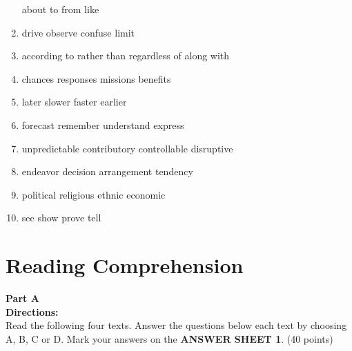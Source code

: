 \begin{enumerate}
\fourchoices
{about}
{to}
{from}
{like}




\item


\fourchoices
{drive}
{observe}
{confuse}
{limit}




\item

\fourchoices
{according to}
{rather than}
{regardless of}
{along with}


\item


\fourchoices
{chances}
{responses}
{missions}
{benefits}




\item


\fourchoices
{later}
{slower}
{faster}
{earlier}




\item


\fourchoices
{forecast}
{remember}
{understand}
{express}




\item

\fourchoices
{unpredictable}
{contributory}
{controllable}
{disruptive}


\item

\fourchoices
{endeavor}
{decision}
{arrangement}
{tendency}



\item


\fourchoices
{political}
{religious}
{ethnic}
{economic}




\item


\fourchoices
{see}
{show}
{prove}
{tell}

\end{enumerate}

\vfil

\section{Reading Comprehension}


\noindent
\textbf{Part A}\\
\textbf{Directions:}\\
Read the following four texts. Answer the questions below each
	text by choosing A, B, C or
	D. Mark your answers on the \textbf{ANSWER SHEET 1}.
	(40 points)

